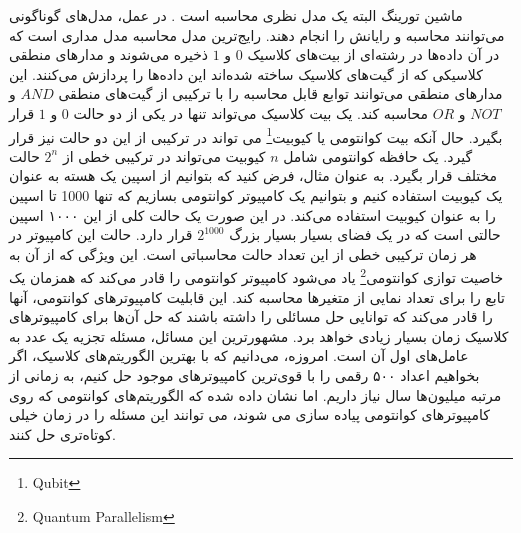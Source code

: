 ماشین تورینگ البته یک مدل نظری محاسبه است . در عمل، مدل‌های گوناگونی می‌توانند محاسبه و رایانش را انجام دهند. رایج‌ترین مدل محاسبه مدل مداری است که در آن داده‌ها در رشته‌ای از بیت‌های کلاسیک $0$ و $1$ ذخیره می‌شوند و مدارهای منطقی کلاسیکی که از گیت‌های کلاسیک ساخته شده‌اند این داده‌ها را پردازش می‌کنند. این مدارهای منطقی می‌توانند توابع قابل محاسبه را با ترکیبی از گیت‌های منطقی $AND$ و $NOT$ و $OR$ محاسبه کند. یک بیت کلاسیک می‌تواند تنها در یکی از دو حالت $0$ و $1$ قرار بگیرد. حال آنکه بیت کوانتومی یا کیوبیت\footnote{Qubit} می تواند در ترکیبی از این دو حالت نیز قرار گیرد. یک حافظه کوانتومی شامل $n$ کیوبیت می‌تواند در ترکیبی خطی از $2^{n}$ حالت مختلف قرار بگیرد. به عنوان مثال، فرض کنید که بتوانیم از اسپین یک هسته به عنوان یک کیوبیت استفاده کنیم و بتوانیم یک کامپیوتر کوانتومی
بسازیم که تنها 1000 تا اسپین را به عنوان کیوبیت استفاده می‌کند. در این صورت یک حالت کلی از این ١٠٠٠ اسپین حالتی است که در یک فضای بسیار بسیار بزرگ $2^{1000}$ قرار دارد. حالت این کامپیوتر در هر زمان ترکیبی خطی از این تعداد حالت محاسباتی است. این ویژگی که از آن به خاصیت توازی کوانتومی\footnote{Quantum Parallelism} یاد می‌شود کامپیوتر کوانتومی را قادر می‌کند که همزمان یک تابع را برای تعداد نمایی از متغیرها محاسبه کند. 
این
قابلیت کامپیوترهای کوانتومی، آنها را قادر می‌کند که توانایی حل مسائلی را داشته باشند که حل آن‌ها برای کامپیوترهای کلاسیک زمان بسیار زیادی خواهد
برد. مشهورترین این مسائل، مسئله تجزیه یک عدد به عامل‌های اول آن است.
امروزه، می‌دانیم که با بهترین الگوریتم‌های کلاسیک، اگر بخواهیم
اعداد ۵٠٠ رقمی را با قوی‌ترین کامپیوترهای موجود حل کنیم، به زمانی از مرتبه میلیون‌ها سال نیاز داریم. اما نشان داده شده که الگوریتم‌های کوانتومی که روی کامپیوترهای کوانتومی پیاده سازی می شوند، می توانند این مسئله را در زمان خیلی کوتاه‌تری حل کنند.

